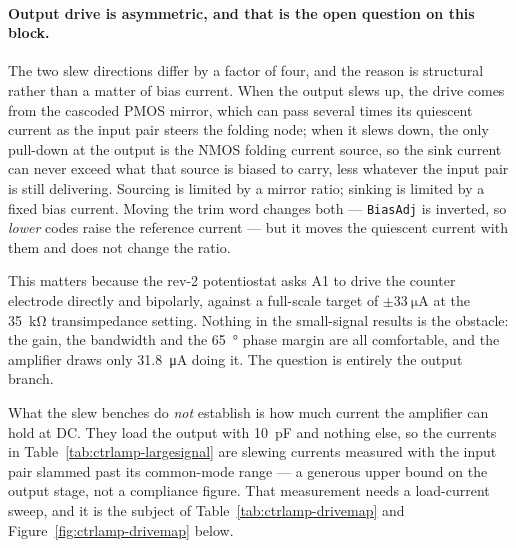 %

\paragraph{Output drive is asymmetric, and that is the open question on this block.}
The two slew directions differ by a factor of four, and the reason is structural rather
than a matter of bias current. When the output slews up, the drive comes from the
cascoded PMOS mirror, which can pass several times its quiescent current as the input
pair steers the folding node; when it slews down, the only pull-down at the output is
the NMOS folding current source, so the sink current can never exceed what that source
is biased to carry, less whatever the input pair is still delivering. Sourcing is
limited by a mirror ratio; sinking is limited by a fixed bias current. Moving the trim
word changes both --- \texttt{BiasAdj} is inverted, so \emph{lower} codes raise the
reference current --- but it moves the quiescent current with them and does not change
the ratio.

This matters because the rev-2 potentiostat asks A1 to drive the counter electrode
directly and bipolarly, against a full-scale target of \(\pm\SI{33}{\micro\ampere}\) at
the \SI{35}{\kilo\ohm} transimpedance setting. Nothing in the small-signal results is
the obstacle: the gain, the bandwidth and the \SI{65}{\degree} phase margin are all
comfortable, and the amplifier draws only \SI{31.8}{\micro\ampere} doing it. The
question is entirely the output branch.

What the slew benches do \emph{not} establish is how much current the amplifier can hold
at DC. They load the output with \SI{10}{\pico\farad} and nothing else, so the currents
in Table~\ref{tab:ctrlamp-largesignal} are slewing currents measured with the input pair
slammed past its common-mode range --- a generous upper bound on the output stage, not a
compliance figure. That measurement needs a load-current sweep, and it is the subject of
Table~\ref{tab:ctrlamp-drivemap} and Figure~\ref{fig:ctrlamp-drivemap} below.

